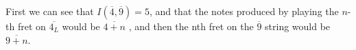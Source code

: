 \documentclass[preview]{standalone}
\begin{document}
\begin{center}
First we can see that $I(\overline{4}, \overline{9}) = 5$, and that the notes produced by playing the $n$-th fret on $\overline{4_L}$ would be $\overline{4 + n}$ , and then the nth fret on the $\overline{9}$ string would be $ \overline{9 + n}$.
\end{center}
\end{document}
